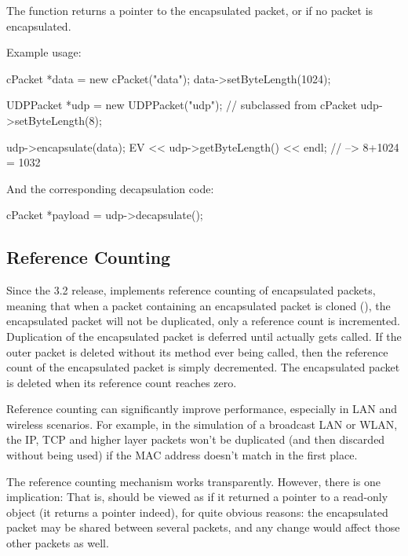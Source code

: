 The  function returns a pointer to the
encapsulated packet, or  if no packet is encapsulated.

Example usage:

\begin{cpp}
cPacket *data = new cPacket("data");
data->setByteLength(1024);

UDPPacket *udp = new UDPPacket("udp"); // subclassed from cPacket
udp->setByteLength(8);

udp->encapsulate(data);
EV << udp->getByteLength() << endl; // --> 8+1024 = 1032
\end{cpp}

And the corresponding decapsulation code:

\begin{cpp}
cPacket *payload = udp->decapsulate();
\end{cpp}



\subsection{Reference Counting}
\label{sec:messages:reference-counting}

Since the 3.2 release, {\opp} implements reference counting of encapsulated
packets, meaning that when a packet containing an encapsulated packet is
cloned (), the encapsulated packet will not be duplicated,
only a reference count is incremented. Duplication of
the encapsulated packet is deferred until 
actually gets called. If the outer packet is deleted without its
 method ever being called, then the reference
count of the encapsulated packet is simply decremented. The
encapsulated packet is deleted when its reference count reaches
zero.

Reference counting can significantly improve performance, especially
in LAN and wireless scenarios. For example, in the simulation of a
broadcast LAN or WLAN, the IP, TCP and higher layer packets won't
be duplicated (and then discarded without being used) if the
MAC address doesn't match in the first place.

The reference counting mechanism works transparently. However, there
is one implication:  That is,
 should be viewed as if it returned a
pointer to a read-only object (it returns a  pointer
indeed), for quite obvious reasons: the encapsulated packet may be
shared between several packets, and any change would affect those
other packets as well.


